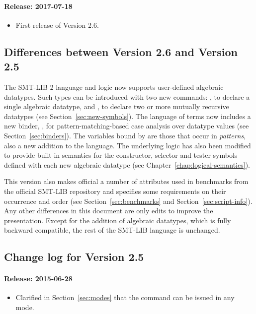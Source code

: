 \paragraph{Release: 2017-07-18}
\begin{itemize}
\item First release of Version 2.6.
\end{itemize}

\subsection{Differences between Version 2.6 and Version 2.5}

The SMT-LIB 2 language and logic now supports user-defined algebraic datatypes.
Such types can be introduced with two new commands:
, to declare a single algebraic datatype, and
, to declare two or more mutually recursive datatypes
(see Section~\ref{sec:new-symbols}).
The language of terms now includes a new binder, , 
for pattern-matching-based case analysis over datatype values
(see Section~\ref{sec:binders}).
The variables bound by  are those that occur in \emph{patterns},
also a new addition to the language.
The underlying logic has also been modified to provide built-in semantics
for the constructor, selector and tester symbols defined 
with each new algebraic datatype
(see Chapter~\ref{chap:logical-semantics}).

This version also makes official a number of  attributes
used in benchmarks from the official SMT-LIB repository
and specifies some requirements on their occurrence and order
(see Section~\ref{sec:benchmarks} and Section~\ref{sec:script-info}).
Any other differences in this document are only edits to improve 
the presentation.
Except for the addition of algebraic datatypes, 
which is fully backward compatible,
the rest of the SMT-LIB language is unchanged.


\subsection{Change log for Version 2.5}

\paragraph{Release: 2015-06-28}
\begin{itemize}
\item 
Clarified in Section~\ref{sec:modes} that the  command can be issued in any mode.
\end{itemize}


